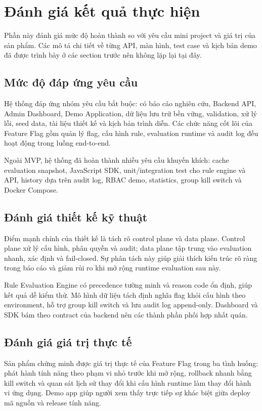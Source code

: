 \section{Đánh giá kết quả thực hiện}

Phần này đánh giá mức độ hoàn thành so với yêu cầu mini project và giá trị của sản phẩm. Các mô tả chi tiết về từng API, màn hình, test case và kịch bản demo đã được trình bày ở các section trước nên không lặp lại tại đây.

\subsection{Mức độ đáp ứng yêu cầu}

Hệ thống đáp ứng nhóm yêu cầu bắt buộc: có báo cáo nghiên cứu, Backend API, Admin Dashboard, Demo Application, dữ liệu lưu trữ bền vững, validation, xử lý lỗi, seed data, tài liệu thiết kế và kịch bản trình diễn. Các chức năng cốt lõi của Feature Flag gồm quản lý flag, cấu hình rule, evaluation runtime và audit log đều hoạt động trong luồng end-to-end.

Ngoài MVP, hệ thống đã hoàn thành nhiều yêu cầu khuyến khích: cache evaluation snapshot, JavaScript SDK, unit/integration test cho rule engine và API, history dựa trên audit log, RBAC demo, statistics, group kill switch và Docker Compose.

\subsection{Đánh giá thiết kế kỹ thuật}

Điểm mạnh chính của thiết kế là tách rõ control plane và data plane. Control plane xử lý cấu hình, phân quyền và audit; data plane tập trung vào evaluation nhanh, xác định và fail-closed. Sự phân tách này giúp giải thích kiến trúc rõ ràng trong báo cáo và giảm rủi ro khi mở rộng runtime evaluation sau này.

Rule Evaluation Engine có precedence tường minh và reason code ổn định, giúp kết quả dễ kiểm thử. Mô hình dữ liệu tách định nghĩa flag khỏi cấu hình theo environment, hỗ trợ group kill switch và lưu audit log append-only. Dashboard và SDK bám theo contract của backend nên các thành phần phối hợp nhất quán.

\subsection{Đánh giá giá trị thực tế}

Sản phẩm chứng minh được giá trị thực tế của Feature Flag trong ba tình huống: phát hành tính năng theo phạm vi nhỏ trước khi mở rộng, rollback nhanh bằng kill switch và quan sát lịch sử thay đổi khi cấu hình runtime làm thay đổi hành vi ứng dụng. Demo app giúp người xem thấy trực tiếp sự khác biệt giữa deploy mã nguồn và release tính năng.

